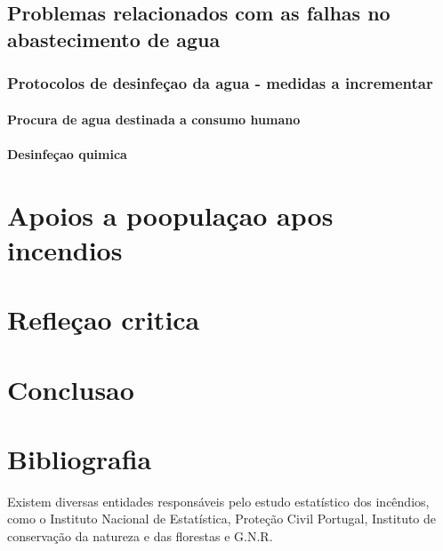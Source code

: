 \documentclass[a4paper,11pt,onecloumn,oneside]{article}
\begin{document}
\chapter{Problemas relacionados com as falhas no abastecimento de agua}

\section{Protocolos de desinfeçao da agua - medidas a incrementar}

\subsection{Procura de agua destinada a consumo humano}
\subsection{Desinfeçao quimica}

\part{Apoios a poopulaçao apos incendios}

\part{Refleçao critica}

\part{Conclusao}

\part{Bibliografia}

Existem diversas entidades responsáveis pelo estudo estatístico dos incêndios, como o Instituto Nacional de Estatística, Proteção Civil Portugal, Instituto de conservação da natureza e das florestas e G.N.R.
\end{document}
